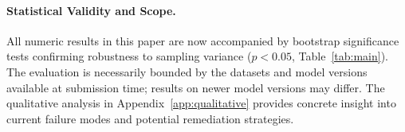 \paragraph{Statistical Validity and Scope.}
All numeric results in this paper are now accompanied by bootstrap significance tests confirming robustness to sampling variance ($p{<}0.05$, Table~\ref{tab:main}). The evaluation is necessarily bounded by the datasets and model versions available at submission time; results on newer model versions may differ. The qualitative analysis in Appendix~\ref{app:qualitative} provides concrete insight into current failure modes and potential remediation strategies.
